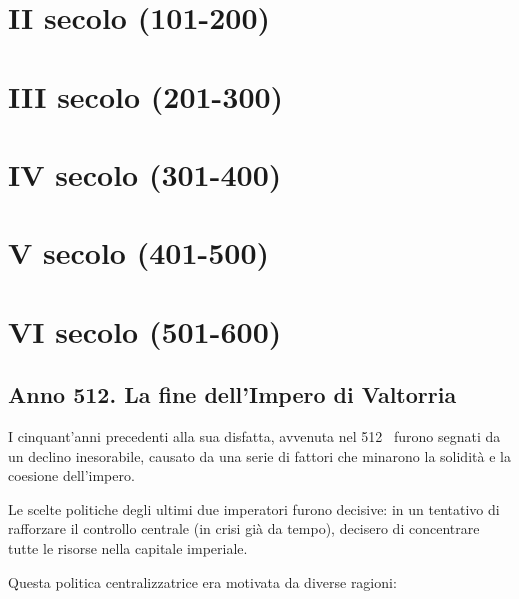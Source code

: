 \section{II secolo (101-200)}\label{ii-secolo-101-200}

\section{III secolo (201-300)}\label{iii-secolo-201-300}

\section{IV secolo (301-400)}\label{iv-secolo-301-400}

\section{V secolo (401-500)}\label{v-secolo-401-500}

\section{VI secolo (501-600)}\label{vi-secolo-501-600}

\subsection{Anno 512. La fine dell'Impero di
Valtorria}\label{anno-512.-la-fine-dellimpero-di-valtorria}

I cinquant'anni precedenti alla sua disfatta, avvenuta nel 512 ~furono
segnati da un declino inesorabile, causato da una serie di fattori che
minarono la solidità e la coesione dell'impero.

Le scelte politiche degli ultimi due imperatori furono decisive: in un
tentativo di rafforzare il controllo centrale (in crisi già da tempo),
decisero di concentrare tutte le risorse nella capitale imperiale.

Questa politica centralizzatrice era motivata da diverse ragioni:

